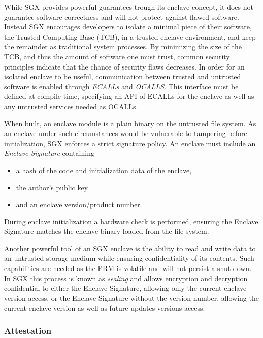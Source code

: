 \documentclass[12pt]{article}
\begin{document}
      While SGX provides powerful guarantees trough its enclave concept, it does not guarantee software correctness and will not protect against flawed software.
      Instead SGX encourages developers to isolate a minimal piece of their software, the Trusted Computing Base (TCB), in a trusted enclave environment, and keep the remainder as traditional system processes.
      By minimizing the size of the TCB, and thus the amount of software one must trust, common security principles indicate that the chance of security flaws decreases.
      In order for an isolated enclave to be useful, communication between trusted and untrusted software is enabled through \textit{ECALLs} and \textit{OCALLS}.
      This interface must be defined at compile-time, specifying an API of ECALLs for the enclave as well as any untrusted services needed as OCALLs.

      When built, an enclave module is a plain binary on the untrusted file system.
      As an enclave under such circumstances would be vulnerable to tampering before initialization, SGX enforces a strict signature policy.
      An enclave must include an \textit{Enclave Signature} containing
      \begin{itemize}
        \item a hash of the code and initialization data of the enclave,
        \item the author's public key
        \item and an enclave version/product number.
      \end{itemize}
      During enclave initialization a hardware check is performed, ensuring the Enclave Signature matches the enclave binary loaded from the file system.

      Another powerful tool of an SGX enclave is the ability to read and write data to an untrusted storage medium while ensuring confidentiality of its contents.
      Such capabilities are needed as the PRM is volatile and will not persist a shut down.
      In SGX this process is known as \textit{sealing} and allows encryption and decryption confidential to either the Enclave Signature, allowing only the current enclave version access, or the Enclave Signature without the version number, allowing the current enclave version as well as future updates versions access.

			\subsubsection{Attestation}
\end{document}
